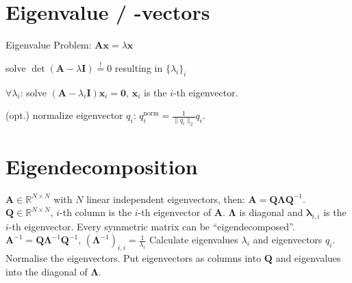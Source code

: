\documentclass[a4paper, 11pt, landscape]{article}
\begin{document}
\begin{multicols*}{3}
\section{Eigenvalue / -vectors}
Eigenvalue Problem: $\mathbf{Ax} = \lambda \mathbf{x}$
\begin{compactenum}
	\item solve $\operatorname{det}(\mathbf{A} - \lambda \mathbf{I}) \overset{!}{=} 0$ resulting in $\{\lambda_i\}_i$
	\item $\forall \lambda_i$:
		solve $(\mathbf{A} - \lambda_i \mathbf{I}) \mathbf{x}_i = \mathbf{0}$, $\mathbf{x}_i$ is the $i$-th eigenvector.
	\item (opt.) normalize eigenvector $q_i$: $q_i^{\text{norm}} = \frac{1}{\|q_i\|_2} q_i$.
\end{compactenum}

\section{Eigendecomposition}
$\mathbf{A} \in \mathbb{R}^{N \times N}$ with $N$ linear independent eigenvectors, then: $\mathbf{A} = \mathbf{Q} \boldsymbol{\Lambda} \mathbf{Q}^{-1}$. $\mathbf{Q} \in \mathbb{R}^{N \times N}$, $i$-th column is the $i$-th eigenvector of $\mathbf{A}$. $\boldsymbol{\Lambda}$ is diagonal and $\boldsymbol{\lambda}_{i,i}$ is the $i$-th eigenvector. Every symmetric matrix can be ``eigendecomposed''. 
$\mathbf{A}^{-1} = \mathbf{Q} \boldsymbol{\Lambda}^{-1} \mathbf{Q}^{-1}$, $(\boldsymbol{\Lambda}^{-1})_{i,i} = \frac{1}{\lambda_i}$
Calculate eigenvalues $\lambda_i$ and eigenvectors $q_i$. Normalise the eigenvectors. Put eigenvectors as columns into $\mathbf{Q}$ and eigenvalues into the diagonal of $\boldsymbol{\Lambda}$.


\end{multicols*}
\end{document}
